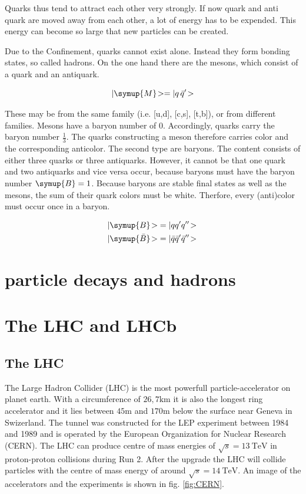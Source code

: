 Quarks thus tend to attract each other very strongly. If now
quark and anti quark are moved away from each other, a lot of energy has to be expended. This energy can become so large that new particles can be created.

Due to the Confinement, quarks cannot exist alone. Instead they form bonding states, so called hadrons. On the one hand there are the mesons, which consist of a quark
and an antiquark.

\begin{equation}
	|\symup{M}\!> = | q\, \bar{q}'\!>
\end{equation}

These may be from the same family (i.e. [u,d], [c,s], [t,b]), or from
different families. Mesons have a baryon number of 0. Accordingly, quarks carry the baryon number $\frac{1}{3}$. The quarks constructing a meson therefore carries color and the corresponding anticolor.
The second type are baryons. The content consists of either three quarks or
three antiquarks. However, it cannot be that one quark and two antiquarks
and vice versa occur, because baryons must have the baryon number $\symup{B} = 1$. Because baryons are stable final states as well as the mesons, the sum of their quark colors must be white. Therfore, every (anti)color must occur once in a baryon.

\begin{align}
	|\symup{B}\!> &= |q q' q''\!> \\
	|\symup{\bar{B}}\!> &= |\bar{q} \bar{q}' \bar{q}''\!> \,
\end{align}

\section{particle decays and hadrons}
\label{sec:decays}

\section{The LHC and LHCb}
\label{sec:lhcandB}

\subsection{The LHC}
The Large Hadron Collider (LHC)\cite{lhcInfo} is the most powerfull particle-accelerator on planet earth. With a circumference of $26,7\si{\kilo\metre}$ it is also the longest ring accelerator and it lies between $45\si{\metre}$ and $170\si{\metre}$ below the surface near Geneva in Swizerland. The tunnel was constructed for the LEP experiment between 1984 and 1989 and is operated by the European Organization for Nuclear Research (CERN). The LHC can produce centre of mass energies of $\sqrt{s} = \SI{13}{\tera\electronvolt}$ in proton-proton collisions during Run 2. After the upgrade the LHC will collide particles with the centre of mass energy of around $\sqrt{s} = \SI{14}{\tera\electronvolt}$.
An image of the accelerators and the experiments is shown in fig. \ref{fig:CERN}\cite{facilityCERN}.

